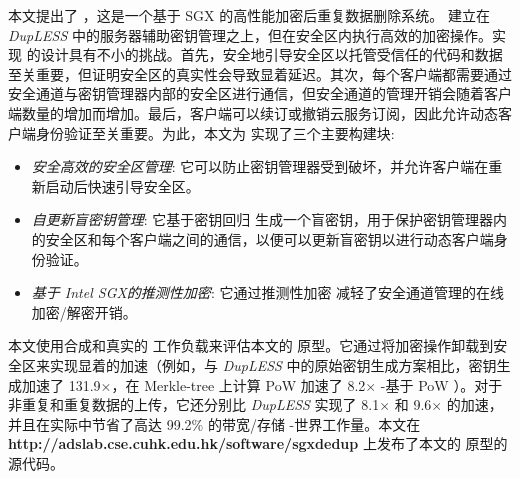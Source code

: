 本文提出了 \sysnameS，这是一个基于 SGX 的高性能加密后重复数据删除系统。 \sysnameS 建立在 {\em DupLESS} \cite{bellare2013DupLESS} 中的服务器辅助密钥管理之上，但在安全区内执行高效的加密操作。实现 \sysnameS 的设计具有不小的挑战。首先，安全地引导安全区以托管受信任的代码和数据至关重要，但证明安全区的真实性会导致显着延迟。其次，每个客户端都需要通过安全通道与密钥管理器内部的安全区进行通信，但安全通道的管理开销会随着客户端数量的增加而增加。最后，客户端可以续订或撤销云服务订阅，因此允许动态客户端身份验证至关重要。为此，本文为 \sysnameS 实现了三个主要构建块: 

\begin{itemize}[leftmargin=*]
    \item \textit{安全高效的安全区管理}:
        它可以防止密钥管理器受到破坏，并允许客户端在重新启动后快速引导安全区。
    \item \textit{自更新盲密钥管理}:
        它基于密钥回归 \cite{fu06} 生成一个盲密钥，用于保护密钥管理器内的安全区和每个客户端之间的通信，以便可以更新盲密钥以进行动态客户端身份验证。
    \item \textit{基于 Intel SGX的推测性加密}:
        它通过推测性加密 \cite{eduardo2019Speculative} 减轻了安全通道管理的在线加密/解密开销。
\end{itemize}

本文使用合成和真实的 \cite{fsl,meyer11} 工作负载来评估本文的 \sysnameS 原型。它通过将加密操作卸载到安全区来实现显着的加速（例如，与 {\em DupLESS} \cite{bellare2013DupLESS} 中的原始密钥生成方案相比，密钥生成加速了 131.9$\times$，在 Merkle-tree 上计算 PoW 加速了 8.2$\times$ -基于 PoW \cite{halevi11}）。对于非重复和重复数据的上传，它还分别比 {\em DupLESS} \cite{bellare2013DupLESS} 实现了 8.1$\times$ 和 9.6$\times$ 的加速，并且在实际中节省了高达 99.2\% 的带宽/存储 -世界工作量。本文在 {\bf http://adslab.cse.cuhk.edu.hk/software/sgxdedup} 上发布了本文的 \sysnameS 原型的源代码。 

